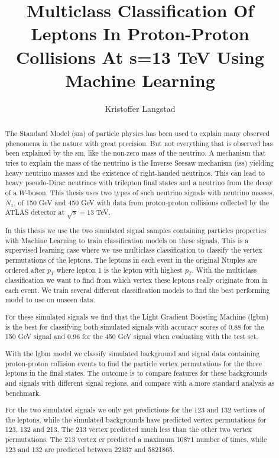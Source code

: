 \documentclass[a4paper, american, 12pt]{report}
\title{Multiclass Classification Of Leptons In Proton-Proton Collisions At \textsurd s=13 TeV Using Machine Learning}
\author{Kristoffer Langstad}
\begin{document}
	\duoforside[program={Computational Science: Physics}, dept={Department of Physics}, long]


	\begin{abstract}
		The Standard Model (\acrshort{sm}) of particle physics has been used to explain many observed phenomena in the nature with great precision. But not everything that is observed has been explained by the \acrshort{sm}, like the non-zero mass of the neutrino. A mechanism that tries to explain the mass of the neutrino is the Inverse Seesaw mechanism (\acrshort{iss}) yielding heavy neutrino masses and the existence of right-handed neutrinos. This can lead to heavy pseudo-Dirac neutrinos with trilepton final states and a neutrino from the decay of a $W$-boson. This thesis uses two types of such neutrino signals with neutrino masses, $N_1$, of 150 GeV and 450 GeV with data from proton-proton collisions collected by the ATLAS detector at $\sqrt{s}=13$ TeV.
		
		In this thesis we use the two simulated signal samples containing particles properties with Machine Learning to train classification models on these signals. This is a supervised learning case where we use multiclass classification to classify the vertex permutations of the leptons. The leptons in each event in the original Ntuples are ordered after $p_T$ where lepton 1 is the lepton with highest $p_T$. With the multiclass classification we want to find from which vertex these leptons really originate from in each event. We train several different classification models to find the best performing model to use on unseen data.
		 
		For these simulated signals we find that the Light Gradient Boosting Machine (\acrshort{lgbm}) is the best for classifying both simulated signals with accuracy scores of 0.88 for the 150 GeV signal and 0.96 for the 450 GeV signal when evaluating with the test set. 
		
		With the \acrshort{lgbm} model we classify simulated background and signal data containing proton-proton collision events to find the particle vertex permutations for the three leptons in the final states. The outcome is to compare features for these backgrounds and signals with different signal regions, and compare with a more standard analysis as benchmark. 
		
		For the two simulated signals we only get predictions for the 123 and 132 vertices of the leptons, while the simulated backgrounds have predicted vertex permutations for 123, 132 and 213. The 213 vertex predicted much less than the other two vertex permutations. The 213 vertex er predicted a maximum 10871 number of times, while 123 and 132 are predicted between 22337 and 5821865.
		

\end{abstract}
\end{document}
